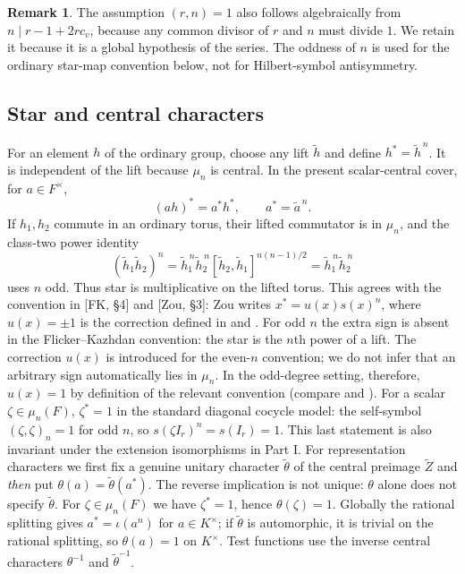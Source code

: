\documentclass[11pt]{article}
\newcommand{\tZ}{\widetilde Z}
\theoremstyle{plain}
\theoremstyle{definition}
\newtheorem{remark}[theorem]{Remark}
\begin{document}
\begin{remark}
The assumption $(r,n)=1$ also follows algebraically from
$n\mid r-1+2rc_v$, because any common divisor of $r$ and $n$ must
divide $1$.  We retain it because it is a global hypothesis of the
series.  The oddness of $n$ is used for the ordinary star-map
convention below, not for Hilbert-symbol antisymmetry.
\end{remark}

\subsection{Star and central characters}\label{subsec:star}
For an element $h$ of the ordinary group, choose any lift
$\widetilde h$ and define $h^*=\widetilde h^{\,n}$.  It is
independent of the lift because $\mu_n$ is central.  In the present
scalar-central cover, for $a\in F^\times$,
\begin{equation}\label{eq:starcentral}
 (ah)^*=a^*h^*,\qquad a^*=\widetilde a^{\,n}.
\end{equation}
If $h_1,h_2$ commute in an ordinary torus, their lifted commutator
is in $\mu_n$, and the class-two power identity
\begin{equation}\label{eq:starpower}
 (\widetilde h_1\widetilde h_2)^n
 =\widetilde h_1^{\,n}\widetilde h_2^{\,n}
 [\widetilde h_2,\widetilde h_1]^{n(n-1)/2}
 =\widetilde h_1^{\,n}\widetilde h_2^{\,n}
\end{equation}
uses $n$ odd.  Thus star is multiplicative on the lifted torus.
This agrees with the convention in [FK, \S4] and [Zou, \S3]:
Zou writes $x^*=u(x)s(x)^n$, where $u(x)=\pm1$ is the
correction defined in \cite[\S4]{FK} and \cite[\S3.1]{Zou24}.
For odd $n$ the extra sign is absent in the
Flicker--Kazhdan convention: the star is the $n$th power of a lift.
The correction $u(x)$ is introduced for the even-$n$ convention;
we do not infer that an arbitrary sign automatically lies in
$\mu_n$.  In the odd-degree setting, therefore, $u(x)=1$
by definition of the relevant convention (compare
\cite[\S4]{FK} and \cite[\S3.1]{Zou24}).  For a scalar $\zeta\in\mu_n(F)$,
$\zeta^*=1$ in the standard diagonal cocycle model: the
self-symbol $(\zeta,\zeta)_n=1$ for odd $n$, so
$s(\zeta I_r)^n=s(I_r)=1$.  This last statement is also
invariant under the extension isomorphisms in Part I.
For representation characters we first fix a genuine unitary
character $\widetilde\theta$ of the central preimage $\tZ$ and
\emph{then} put $\theta(a)=\widetilde\theta(a^*)$.
The reverse implication is not unique: $\theta$ alone does not
specify $\widetilde\theta$.  For $\zeta\in\mu_n(F)$ we have
$\zeta^*=1$, hence $\theta(\zeta)=1$.  Globally the rational
splitting gives $a^*=\iota(a^n)$ for $a\in K^\times$;
if $\widetilde\theta$ is automorphic, it is trivial on the rational
splitting, so $\theta(a)=1$ on $K^\times$.
Test functions use the inverse central characters
$\theta^{-1}$ and $\widetilde\theta^{-1}$.
\end{document}
